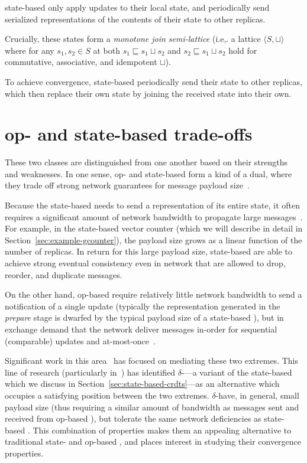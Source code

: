 \begin{definition}
  state-based \CRDTs only apply updates to their local state, and periodically
  send serialized representations of the contents of their state to other
  replicas.

  Crucially, these states form a \textit{monotone join semi-lattice} (i.e,. a
  lattice $\langle S, \sqcup \rangle$ where for any $s_1, s_2 \in S$ at both
  $s_1 \sqsubseteq s_1 \sqcup s_2$ and $s_2 \sqsubseteq s_1 \sqcup s_2$ hold for
  commutative, associative, and idempotent $\sqcup$).

  To achieve convergence, state-based \CRDTs periodically send their state to
  other replicas, which then replace their own state by joining the received
  state into their own.
\end{definition}

\section{op- and state-based trade-offs}

These two classes are distinguished from one another based on their strengths
and weaknesses. In one sense, op- and state-based \CRDTs form a kind of a dual,
where they trade off strong network guarantees for message payload
size~\citep{baquero14}.

Because the state-based \CRDT needs to send a representation of its entire state,
it often requires a significant amount of network bandwidth to propagate large
messages~\citep{almedia18}. For example, in the state-based vector counter
(which we will describe in detail in Section~\ref{sec:example-gcounter}), the
payload size grows as a linear function of the number of replicas. In return for
this large payload size, state-based \CRDTs are able to achieve strong eventual
consistency even in network that are allowed to drop, reorder, and duplicate
messages.

On the other hand, op-based \CRDTs require relatively little network bandwidth
to send a notification of a single update (typically the representation
generated in the \textit{prepare} stage is dwarfed by the typical payload size
of a state-based \CRDT), but in exchange demand that the network deliver
messages in-order for sequential (comparable) updates and
at-most-once~\citep{shapiro11}.

Significant work in this area~\cite{almedia18, enes18, cabrita17, vanDerLinde16}
has focused on mediating these two extremes. This line of research (particularly
in~\citep{almedia18}) has identified $\delta$-\CRDTs---a variant of the
state-based \CRDT which we discuss in Section~\ref{sec:state-based-crdts}---as an
alternative which occupies a satisfying position between the two extremes.
$\delta$-\CRDTs have, in general, small payload size (thus requiring a similar
amount of bandwidth as messages sent and received from op-based \CRDTs), but
tolerate the same network deficiencies as state-based \CRDTs. This combination of
properties makes them an appealing alternative to traditional state- and
op-based \CRDTs, and places interest in studying their convergence properties.

